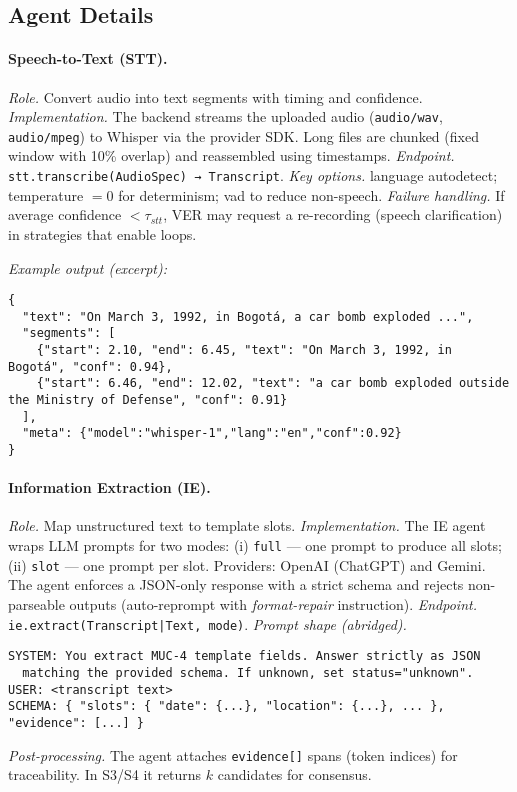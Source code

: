 \subsection*{Agent Details}

\paragraph{Speech-to-Text (STT).}
\emph{Role.} Convert audio into text segments with timing and confidence.  
\emph{Implementation.} The backend streams the uploaded audio (\texttt{audio/wav}, \texttt{audio/mpeg}) to Whisper via the provider SDK. Long files are chunked (fixed window with 10\% overlap) and reassembled using timestamps.  
\emph{Endpoint.} \texttt{stt.transcribe(AudioSpec) → Transcript}.  
\emph{Key options.} language autodetect; temperature $=0$ for determinism; vad to reduce non-speech.  
\emph{Failure handling.} If average confidence $<\tau_{stt}$, VER may request a re-recording (speech clarification) in strategies that enable loops.

\medskip
\noindent\emph{Example output (excerpt):}
\begin{verbatim}
{
  "text": "On March 3, 1992, in Bogotá, a car bomb exploded ...",
  "segments": [
    {"start": 2.10, "end": 6.45, "text": "On March 3, 1992, in Bogotá", "conf": 0.94},
    {"start": 6.46, "end": 12.02, "text": "a car bomb exploded outside the Ministry of Defense", "conf": 0.91}
  ],
  "meta": {"model":"whisper-1","lang":"en","conf":0.92}
}
\end{verbatim}

\paragraph{Information Extraction (IE).}
\emph{Role.} Map unstructured text to template slots.  
\emph{Implementation.} The IE agent wraps LLM prompts for two modes:
(i) \texttt{full} — one prompt to produce all slots; (ii) \texttt{slot} — one prompt per slot. Providers: OpenAI (ChatGPT) and Gemini. The agent enforces a JSON-only response with a strict schema and rejects non-parseable outputs (auto-reprompt with \emph{format-repair} instruction).  
\emph{Endpoint.} \texttt{ie.extract(Transcript|Text, mode)}.  
\emph{Prompt shape (abridged).}
\begin{verbatim}
SYSTEM: You extract MUC-4 template fields. Answer strictly as JSON
  matching the provided schema. If unknown, set status="unknown".
USER: <transcript text>
SCHEMA: { "slots": { "date": {...}, "location": {...}, ... }, "evidence": [...] }
\end{verbatim}
\emph{Post-processing.} The agent attaches \texttt{evidence[]} spans (token indices) for traceability. In S3/S4 it returns $k$ candidates for consensus.

